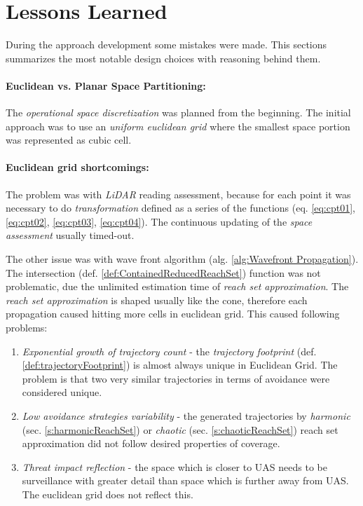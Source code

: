 \setcounter{chapter}{8}
\setcounter{section}{3}
\setcounter{subsection}{0}
\section{Lessons Learned}\label{s:lessonsLearned}
\noindent During the approach development some mistakes were made. This sections summarizes the most notable design choices with reasoning behind them.

\paragraph{Euclidean vs. Planar Space Partitioning:} The \emph{operational space discretization} was planned from the beginning. The initial approach was to use an \emph{uniform euclidean grid} where the smallest space portion was represented as cubic cell.

\paragraph{Euclidean grid shortcomings:} The problem was with \emph{LiDAR} reading assessment, because for each point it was necessary to do \emph{transformation} defined as  a series of the functions (eq. \ref{eq:cpt01}, \ref{eq:cpt02}, \ref{eq:cpt03}, \ref{eq:cpt04}). The continuous updating of the \emph{space assessment} usually timed-out. 

The other issue was with wave front algorithm (alg. \ref{alg:Wavefront Propagation}). The intersection (def. \ref{def:ContainedReducedReachSet}) function was not problematic, due the unlimited estimation time of \emph{reach set approximation}. The \emph{reach set approximation} is shaped usually like the cone, therefore each propagation caused hitting more cells in euclidean grid. This caused following problems:
\begin{enumerate}
    \item \emph{Exponential growth of trajectory count} - the \emph{trajectory footprint} (def. \ref{def:trajectoryFootprint}) is almost always unique in Euclidean Grid. The problem is that two very similar trajectories in terms of avoidance were considered unique.
    
    \item \emph{Low avoidance strategies variability} - the generated trajectories by \emph{harmonic} (sec. \ref{s:harmonicReachSet}) or \emph{chaotic} (sec. \ref{s:chaoticReachSet}) reach set approximation did not follow desired properties of coverage.
    
    \item \emph{Threat impact reflection} - the space which is closer to UAS needs to be surveillance with greater detail than space which is further away from UAS. The euclidean grid does not reflect this.
\end{enumerate}

